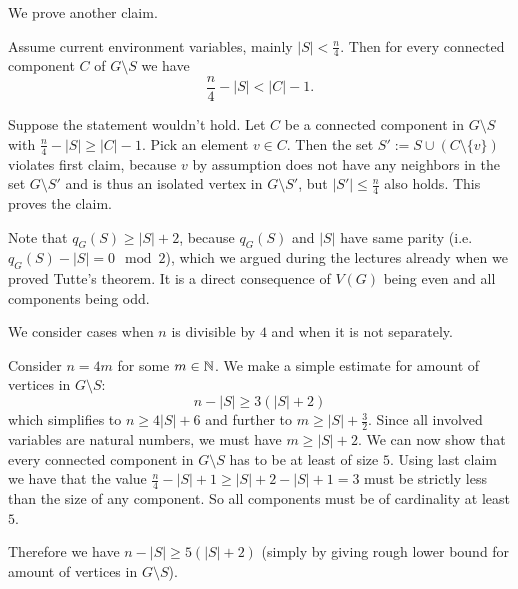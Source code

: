 \begin{exercise}{4}
\begin{itemize}
        We prove another claim.
        \begin{claim}
            Assume current environment variables, mainly $|S| < \frac{n}{4}$.
            Then for every connected component $C$ of $G \setminus S$ we have
            \begin{equation*}
                \frac{n}{4} - |S| < |C| - 1.
            \end{equation*}
        \end{claim}
        \begin{proof_claim}
            Suppose the statement wouldn't hold. Let $C$ be a connected component in
            $G \setminus S$ with $\frac{n}{4} - |S| \geq |C| - 1$. Pick an element $v \in
            C$. Then the set $S' := S \cup (C \setminus \{v\})$ violates first
            claim, because $v$ by assumption does not have any neighbors in the set
            $G \setminus S'$ and is thus an isolated vertex in $G \setminus S'$, but
            $|S'| \leq \frac{n}{4}$ also holds. This proves the claim.
        \end{proof_claim}

        Note that $q_G(S) \geq |S| + 2$, because $q_G(S)$ and $|S|$ have same
        parity (i.e. $q_G(S) - |S| = 0 \mod 2$), which we
        argued during the lectures already when we proved Tutte's theorem. It is a
        direct consequence of $V(G)$ being even and all components being odd.

        We consider cases when $n$ is divisible by $4$ and when it is not
        separately.

        Consider $n = 4m$ for some $m \in \mathbb{N}$.
        We make a simple estimate for amount of vertices in $G \setminus S$:
        \begin{equation*}
            n - |S| \geq 3 (|S| + 2)
        \end{equation*}
        which simplifies to $n \geq 4 |S| + 6$ and further to $m \geq |S| +
        \frac{3}{2}$. Since all involved variables are natural numbers, we must have
        $m \geq |S| + 2$. We can now show that every connected component in $G \setminus
        S$ has to be at least of size $5$. Using last claim we have that the value $\frac{n}{4} -
        |S| + 1 \geq |S| + 2 - |S| + 1 = 3$ must be strictly less than the size of
        any component. So all components must be of cardinality at least $5$.

        Therefore we have $n - |S| \geq 5 (|S| + 2)$ (simply by giving rough lower
        bound for amount of vertices in $G \setminus S$).


\end{itemize}
\end{exercise}
